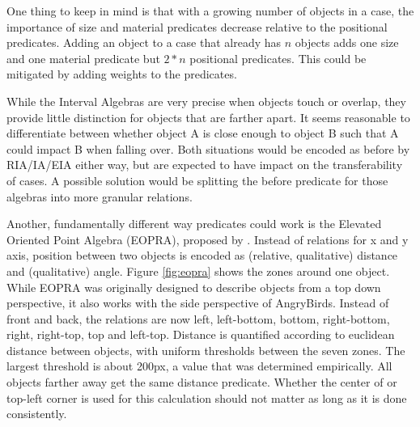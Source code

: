One thing to keep in mind is that with a growing number of objects in a case, the importance of size and material predicates decrease relative to the positional predicates. Adding an object to a case that already has $n$ objects adds one size and one material predicate but $2*n$ positional predicates. This could be mitigated by adding weights to the predicates.

While the Interval Algebras are very precise when objects touch or overlap, they provide little distinction for objects that are farther apart. It seems reasonable to differentiate between whether object A is close enough to object B such that A could impact B when falling over. Both situations would be encoded as before by RIA/IA/EIA either way, but are expected to have impact on the transferability of cases.
A possible solution would be splitting the before predicate for those algebras into more granular relations.

Another, fundamentally different way predicates could work is the Elevated Oriented Point Algebra (EOPRA), proposed by \cite{EOPRA-Perico2016CollaborativeCO}. Instead of relations for x and y axis, position between two objects is encoded as (relative, qualitative) distance and (qualitative) angle.
Figure \ref{fig:eopra} shows the zones around one object. While \ac{EOPRA} was originally designed to describe objects from a top down perspective, it also works with the side perspective of AngryBirds.
Instead of front and back, the relations are now left, left-bottom, bottom, right-bottom, right, right-top, top and left-top.
Distance is quantified according to euclidean distance between objects, with uniform thresholds between the seven zones. The largest threshold is about 200px, a value that was determined empirically. All objects farther away get the same distance predicate. Whether the center of or top-left corner is used for this calculation should not matter as long as it is done consistently.


